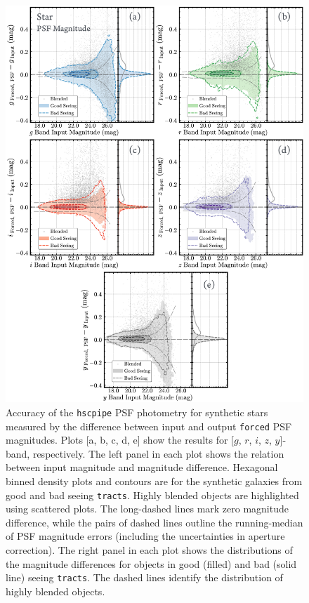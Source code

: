 \documentclass[useamsfonts]{pasj01}
\def\forced{\texttt{forced}}
\def\tracts{\texttt{tracts}}
\begin{document}
\begin{figure}
    \begin{center}
        \includegraphics[width=16cm]{fig/synpipe_psf_mag}
    \end{center}
    \caption{
        Accuracy of the \texttt{hscpipe} PSF photometry for synthetic stars measured
        by the difference between input and output \forced{} PSF magnitudes.
        Plots [a, b, c, d, e] show the results for [$g$, $r$, $i$, $z$, $y$]-band, 
        respectively.
        The left panel in each plot shows the relation between input magnitude and
        magnitude difference.
        Hexagonal binned density plots and contours are for the synthetic galaxies 
        from good and bad seeing \tracts{}.
        Highly blended objects are highlighted using scattered plots.
        The long-dashed lines mark zero magnitude difference, while the pairs of
        dashed lines outline the running-median of PSF magnitude errors
        (including the uncertainties in aperture correction).
        The right panel in each plot shows the distributions of the magnitude 
        differences for objects in good (filled) and bad (solid line) seeing \tracts{}.
        The dashed lines identify the distribution of highly blended objects.
        }
    \label{fig:psf_mag}
\end{figure}
\end{document}
